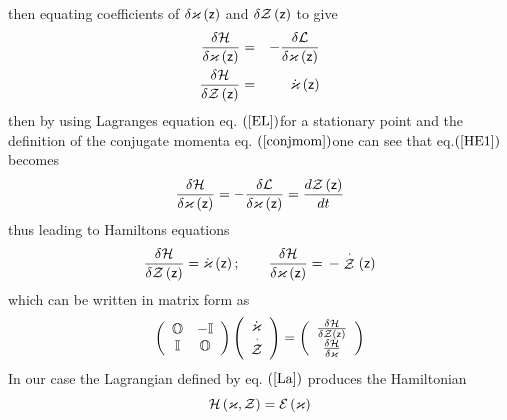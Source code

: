 then equating coefficients of $\delta {\cal \varkappa }\left( {\sf z}\right) 
$ and $\delta {\cal Z}\left( {\sf z}\right) $ to give 
\begin{eqnarray}
\frac{\delta {\cal H}}{\delta {\cal \varkappa }\left( {\sf z}\right) } &=&-%
\frac{\delta {\cal L}}{\delta {\cal \varkappa }\left( {\sf z}\right) }
\label{HE1} \\
\frac{\delta {\cal H}}{\delta {\cal Z}\left( {\sf z}\right) } &=&{\cal \dot{%
\varkappa}}\left( {\sf z}\right)  \label{HE2}
\end{eqnarray}%
then by using Lagranges equation eq. $\left( \ref{EL}\right) $for a
stationary point and the definition of the conjugate momenta eq. $\left( \ref%
{conjmom}\right) $one can see that eq.$\left( \ref{HE1}\right) $ becomes 
\begin{equation}
\frac{\delta {\cal H}}{\delta {\cal \varkappa }\left( {\sf z}\right) }=-%
\frac{\delta {\cal L}}{\delta {\cal \varkappa }\left( {\sf z}\right) }=\frac{%
d{\cal Z}\left( {\sf z}\right) }{dt}
\end{equation}%
thus leading to Hamiltons equations 
\begin{equation}
\frac{\delta {\cal H}}{\delta {\cal Z}\left( {\sf z}\right) }={\cal \dot{%
\varkappa}}\left( {\sf z}\right) ;\qquad \frac{\delta {\cal H}}{\delta {\cal %
\varkappa }\left( {\sf z}\right) }=\,-\stackrel{\cdot }{{\cal Z}}\left( {\sf %
z}\right)
\end{equation}%
which can be written in matrix form as 
\begin{equation}
\left( 
\begin{array}{cc}
{\Bbb O} & -{\Bbb I} \\ 
{\Bbb I} & {\Bbb O}%
\end{array}%
\right) \left( 
\begin{array}{c}
{\cal \dot{\varkappa}} \\ 
\stackrel{\cdot }{{\cal Z}}%
\end{array}%
\right) =\left( 
\begin{array}{c}
\frac{\delta {\cal H}}{\delta {\cal Z}\left( {\sf z}\right) } \\ 
\frac{\delta {\cal H}}{\delta {\cal \varkappa }}%
\end{array}%
\right)
\end{equation}%
In our case the Lagrangian defined by eq. $\left( \ref{La}\right) $ produces
the Hamiltonian 
\begin{equation}
{\cal H}\left( {\cal \varkappa },{\cal Z}\right) ={\cal E}\left( {\cal %
\varkappa }\right)
\end{equation}%
